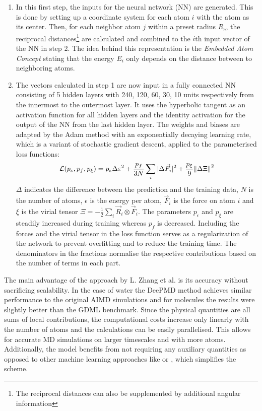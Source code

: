 \begin{enumerate}
	\item In this first step, the inputs for the neural network (NN) are generated. This is done by setting up a coordinate system for each atom $i$ with the atom as its center. Then, for each neighbor atom $j$ within a preset radius $R_c$, the reciprocal distances\footnote{The reciprocal distances can also be supplemented by additional angular information} are calculated and combined to the $i$th input vector of the NN in step 2. The idea behind this representation is the \emph{Embedded Atom Concept} stating that the energy $E_i$ only depends on the distance between to neighboring atoms.
	\item The vectors calculated in step 1 are now input in a fully connected NN consisting of 5 hidden layers with 240, 120, 60, 30, 10 units respectively from the innermost to the outermost layer. It uses the hyperbolic tangent as an activation function for all hidden layers and the identity activation for the output of the NN from the last hidden layer. The weights and biases are adapted by the Adam method \cite{kingma2017adam} with an exponentially decaying learning rate, which is a variant of stochastic gradient descent, applied to the parameterised loss functions:
	$$\mathcal L (p_\varepsilon, p_f, p_\xi) = p_\varepsilon \Delta \varepsilon^2 + \frac{p_f}{3N} \sum_i |\Delta \vec F_i|^2 + \frac{p_\xi}{9} \norm{\Delta \Xi}^2$$
	$\Delta$ indicates the difference between the prediction and the training data, $N$ is the number of atoms, $\epsilon$ is the energy per atom, $\vec F_i$ is the force on atom $i$ and $\xi$ is the virial tensor $\Xi = - \frac{1}{2} \sum_i \vec R_i \otimes \vec F_i$. The parameters $p_\epsilon$ and $p_\xi$ are steadily increased during training whereas $p_f$ is decreased. Including the forces and the virial tensor in the loss function serves as a regularization of the network to prevent overfitting and to reduce the training time. The denominators in the fractions normalise the respective contributions based on the number of terms in each part.
\end{enumerate}
The main advantage of the approach by L. Zhang et al. is its accuracy without sacrificing  scalability. In the case of water the DeePMD method achieves similar performance to the original AIMD simulations and for molecules the results were slightly better than the GDML benchmark. Since the physical quantities are all sums of local contributions, the computational costs increase only linearly with the number of atoms and the calculations can be easily parallelised. This allows for accurate MD simulations on larger timescales and with more atoms. Additionally, the model benefits from not requiring any auxiliary quantities as opposed to other machine learning approaches like \cite{Chmiela_2017} or \cite{PhysRevLett.98.146401}, which simplifies the scheme.

